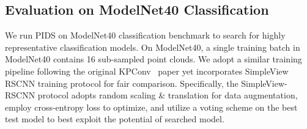 \documentclass[10pt,twocolumn,letterpaper]{article}
\begin{document}
\subsection{Evaluation on ModelNet40 Classification}
We run PIDS on ModelNet40 classification benchmark to search for highly representative classification models.
On ModelNet40, a single training batch in ModelNet40 contains 16 sub-sampled point clouds.
We adopt a similar training pipeline following the original KPConv~\cite{thomas2019kpconv} paper yet incorporates SimpleView~\cite{goyal2021revisiting} RSCNN training protocol for fair comparison.
Specifically, the SimpleView-RSCNN protocol adopts random scaling \& translation for data augmentation, employ cross-entropy loss to optimize, and utilize a voting scheme on the best test model to best exploit the potential of searched model.
\begin{table}[h]
    \begin{center}
    \caption{Overall Accuracy (OA) on ModelNet40. $^*$: Use native protocol instead of SimpleView RSCNN evaluation protocol.}
    \label{tab:result_modelnet40}
    \end{center}
    \vspace{-2em}
\end{table}
\end{document}
